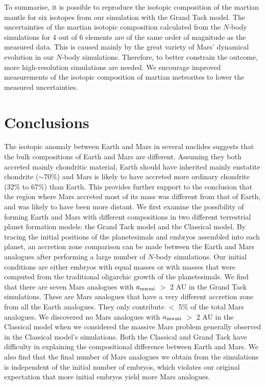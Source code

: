 \documentclass{aa}
\begin{document}
To summarise, it is possible to reproduce the isotopic composition of the martian mantle for six isotopes from our simulation with the Grand Tack model. The uncertainties of the martian isotopic composition calculated from the $N$-body simulations for 4 out of 6 elements are of the same order of magnitude as the measured data. This is caused mainly by the great variety of Mars' dynamical evolution in our $N$-body simulations. Therefore, to better constrain the outcome, more high-resolution simulations are needed. We encourage improved measurements of the isotopic composition of martian meteorites to lower the measured uncertainties.

\section{Conclusions}
\label{sec:conclusions}
The isotopic anomaly between Earth and Mars in several nuclides suggests that the bulk compositions of Earth and Mars are different. Assuming they both accreted mainly chondritic material, Earth should have inherited mainly enstatite chondrite ($\sim$70\%) and Mars is likely to have accreted more ordinary chondrite (32\% to 67\%) than Earth. This provides further support to the conclusion that the region where Mars accreted most of its mass was different from that of Earth, and was likely to have been more distant. We first examine the possibility of forming Earth and Mars with different compositions in two different terrestrial planet formation models: the Grand Tack model and the Classical model. By tracing the initial positions of the planetesimals and embryos assembled into each planet, an accretion zone comparison can be made between the Earth and Mars analogues after performing a large number of $N$-body simulations. Our initial conditions are either embryos with equal masses or with masses that were computed from the traditional oligarchic growth of the planetesimals. We find that there are seven Mars analogues with $a_{\rm mwmi}$ $>$ 2 AU in the Grand Tack simulations. These are Mars analogues that have a very different accretion zone from all the Earth analogues. They only contribute $<$ 5$\%$ of the total Mars analogues. We discovered no Mars analogues with $a_{\rm mwmi}$ $>$ 2 AU in the Classical model when we considered the massive Mars problem generally observed in the Classical model's simulations. Both the Classical and Grand Tack have difficulty in explaining the compositional difference between Earth and Mars. We also find that the final number of Mars analogues we obtain from the simulations is independent of the initial number of embryos, which violates our original expectation that more initial embryos yield more Mars analogues.
\end{document}

